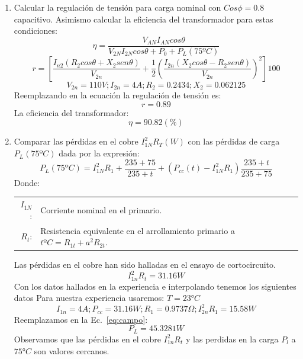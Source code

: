 \documentclass[12pt]{article}
\begin{document}
\begin{enumerate}
    \item Calcular la regulación de tensión para carga nominal con $Cos\phi=0.8$ capacitivo. Asimismo calcular la eficiencia del transformador para estas condiciones:
    \[\eta=\frac{V_{AN}I_{AN}cos\theta}{V_{2N}I_{2N}cos\theta+P_{0}+P_{L}(75ºC)}\]
    \[r=\left[\frac{I_{n2}\left(R_{2}cos\theta+X_{2}sen\theta\right)}{V_{2n}}+\frac{1}{2}\left(\frac{I_{2n}\left(X_{2}cos\theta-R_{2}sen\theta\right)}{V_{2n}}\right)^2\right]100\]
    \[V_{2n}=110V;I_{2n}=4A;R_{2}=0.2434;X_{2}=0.062125\]
    Reemplazando en la ecuación la regulación de tensión es:
    \[r=0.89\]
    La eficiencia del transformador:
    \[\eta=90.82(\%)\]
    
    \item Comparar las pérdidas en el cobre $I_{1N}^2R_{T}(W)$ con las pérdidas de carga $P_{L}(75ºC)$ dada por la expresión:
    \begin{equation}
    \label{eq:campo}
        P_{L}(75ºC)=I_{1N}^2R_{1}+\frac{235+75}{235+t}+\left(P_{cc}(t)-I_{1N}^2R_{1}\right)\frac{235+t}{235+75}
    \end{equation}
    Donde:\\
    \hspace*{3em}
    \begin{tabular}{rl}
        $I_{1N}$:& Corriente nominal en el primario. \\
        $R_{t}$:& Resistencia equivalente en el arrollamiento primario a $tºC=R_{1t}+a^2R_{2t}$. \\
    \end{tabular}
    Las pérdidas en el cobre han sido halladas en el ensayo de cortocircuito.
    \[I_{1n}^2R_{t}=31.16W\]
    Con los datos hallados en la experiencia e interpolando tenemos los siguientes datos Para nuestra experiencia usaremos: $T=23°C$
    \[I_{1n}=4A;P_{cc}=31.16W;R_{1}=0.9737\Omega;I_{2n}^2R_{1}=15.58W\]
    Reemplazamos en la Ec.~\eqref{eq:campo}:
    \[P_{L}=45.3281W\]
    Observamos que las pérdidas en el cobre $I_{1n}^2R_{t}$ y las perdidas en la carga $P_{l}$ a $75°C$ son valores cercanos.
\end{enumerate}



\end{document}
